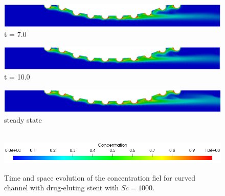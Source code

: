 \begin{figure}[H]
     \begin{minipage}{.50\linewidth}
      \centering
      \includegraphics[scale=0.18]{./02_chaps/cap_solution/figure/conc1000_CurvedStrut6.png}\\
      t = 7.0
     \end{minipage}
     \begin{minipage}{.50\linewidth}
     \medskip
      \centering
      \includegraphics[scale=0.18]{./02_chaps/cap_solution/figure/conc1000_CurvedStrut7.png}\\
      t = 10.0
     \end{minipage}%
     \begin{minipage}{.50\linewidth}
     \medskip
      \centering
      \includegraphics[scale=0.18]{./02_chaps/cap_solution/figure/conc1000_CurvedStrut8.png}\\
      steady state
     \end{minipage}\\[10pt]
      \centering
      \includegraphics[scale=0.5]{./02_chaps/cap_solution/figure/conc1_CurvedStrutScale.png}\\
     \medskip
    \caption{
Time and space evolution of the concentration fiel for curved channel with drug-eluting stent with $Sc=1000$.}
     \label{conc field curved stent sc 1000}
\end{figure}


